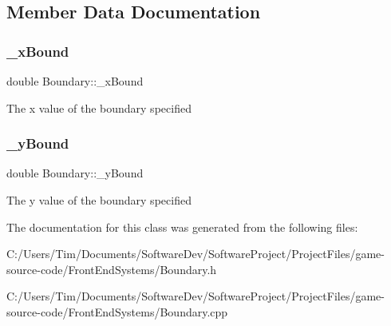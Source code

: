 \subsection{Member Data Documentation}
\mbox{\label{class_boundary_a55685a68cc9b709898bdbe632d2dfeec}} 
\subsubsection{\texorpdfstring{\+\_\+x\+Bound}{\_xBound}}
{\footnotesize\ttfamily double Boundary\+::\+\_\+x\+Bound\hspace{0.3cm}{\ttfamily [private]}}

The x value of the boundary specified \mbox{\label{class_boundary_a709e9e1f24faec6d4a35b50e6faffb8e}} 
\subsubsection{\texorpdfstring{\+\_\+y\+Bound}{\_yBound}}
{\footnotesize\ttfamily double Boundary\+::\+\_\+y\+Bound\hspace{0.3cm}{\ttfamily [private]}}

The y value of the boundary specified 

The documentation for this class was generated from the following files\+:\begin{DoxyCompactItemize}
\item 
C\+:/\+Users/\+Tim/\+Documents/\+Software\+Dev/\+Software\+Project/\+Project\+Files/game-\/source-\/code/\+Front\+End\+Systems/Boundary.\+h\item 
C\+:/\+Users/\+Tim/\+Documents/\+Software\+Dev/\+Software\+Project/\+Project\+Files/game-\/source-\/code/\+Front\+End\+Systems/Boundary.\+cpp\end{DoxyCompactItemize}
